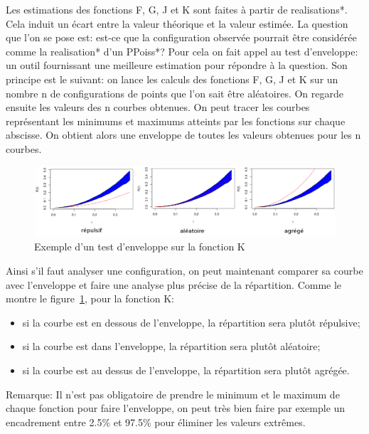 \documentclass[stage2a]{tnreport}
\begin{document}
Les estimations des fonctions F, G, J et K sont faites à partir de \gls{realisation}s*. Cela induit un écart entre la valeur théorique et la valeur estimée. La question que l'on se pose est: est-ce que la configuration observée pourrait être considérée comme la \gls{realisation}* d'un \gls{PPoiss}*? Pour cela on fait appel au test d'enveloppe: un outil fournissant une meilleure estimation pour répondre à la question. Son principe est le suivant:
on lance les calculs des fonctions F, G, J et K sur un nombre n de configurations de points que l'on sait être aléatoires. On regarde ensuite les valeurs des n courbes obtenues. On peut tracer les courbes représentant les minimums et maximums atteints par les fonctions sur chaque abscisse. On obtient alors une enveloppe de toutes les valeurs obtenues pour les n courbes. 

\begin{figure}[h]
  \centering
  \includegraphics[scale=0.45]{figures/exempleEnveloppes.png}
  \caption{Exemple d'un test d'enveloppe sur la fonction K}
  \label{fig:enveloppeK}
\end{figure}

Ainsi s'il faut analyser une configuration, on peut maintenant comparer sa courbe avec l'enveloppe et faire une analyse plus précise de la répartition. Comme le montre le figure~\ref{fig:enveloppeK}, pour la fonction K: 
\begin{itemize}
\item si la courbe est en dessous de l'enveloppe, la répartition sera plutôt répulsive;
\item si la courbe est dans l'enveloppe, la répartition sera plutôt aléatoire;
\item si la courbe est au dessus de l'enveloppe, la répartition sera plutôt agrégée.\\
\end{itemize}

Remarque: Il n'est pas obligatoire de prendre le minimum et le maximum de chaque fonction pour faire l'enveloppe, on peut très bien faire par exemple un encadrement entre 2.5\% et 97.5\% pour éliminer les valeurs extrêmes.

\end{document}

